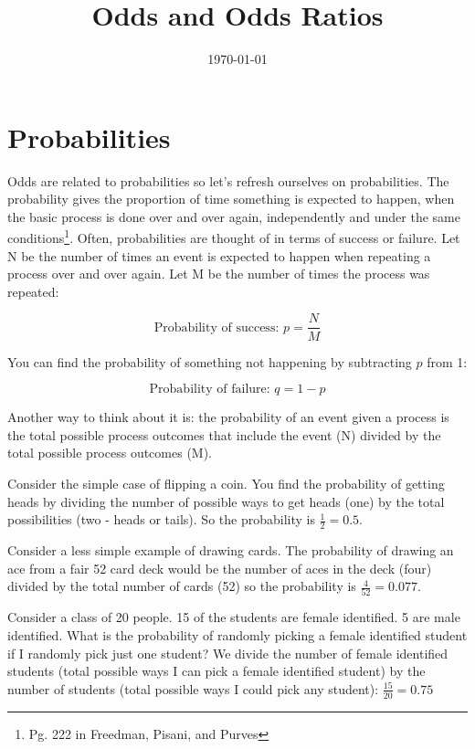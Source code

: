 \documentclass[11pt]{amsart}
\title{Odds and Odds Ratios}
\date{\today}                                           %
\begin{document}
\maketitle



\section{Probabilities}

Odds are related to probabilities so let's refresh ourselves on probabilities. The probability gives the proportion of time something is expected to happen, when the basic process is done over and over again, independently and under the same conditions\footnote{Pg. 222 in Freedman, Pisani, and Purves}. Often, probabilities are thought of in terms of success or failure. Let N be the number of times an event is expected to happen when repeating a process over and over again. Let M be the number of times the process was repeated:

\[ \text{Probability of success: } p = \frac{N}{M} \]

You can find the probability of something not happening by subtracting $p$ from 1:

\[ \text{Probability of failure: } q = 1-p \]

Another way to think about it is: the probability of an event given a process is the total possible process outcomes that include the event (N) divided by the total possible process outcomes (M).

Consider the simple case of flipping a coin. You find the probability of getting heads by dividing the number of possible ways to get heads (one) by the total possibilities (two - heads or tails). So the probability is $\frac{1}{2} = 0.5$.

Consider a less simple example of drawing cards. The probability of drawing an ace from a fair 52 card deck would be the number of aces in the deck (four) divided by the total number of cards (52) so the probability is $\frac{4}{52} = 0.077$.

Consider a class of 20 people. 15 of the students are female identified. 5 are male identified. What is the probability of randomly picking a female identified student if I randomly pick just one student? We divide the number of female identified students (total possible ways I can pick a female identified student) by the number of students (total possible ways I could pick any student): $\frac{15}{20} = 0.75$
\end{document}

